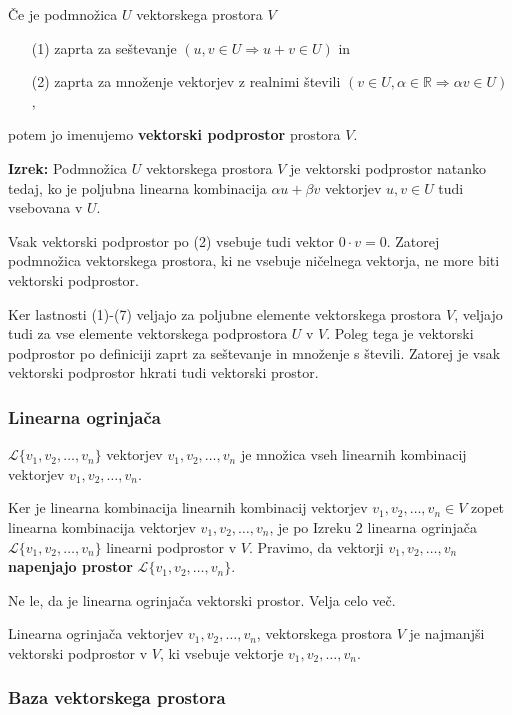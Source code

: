 \documentclass{article}
\begin{document}
\begin{multicols}{2}
Če je podmnožica \( U \) vektorskega prostora \( V \)
\begin{itemize}
    \item[(1)] zaprta za seštevanje \( (u, v \in U \Rightarrow u + v \in U) \) in
    \item[(2)] zaprta za množenje vektorjev z realnimi števili \( (v \in U, \alpha \in \mathbb{R} \Rightarrow \alpha v \in U) \),
\end{itemize}
potem jo imenujemo \textbf{vektorski podprostor} prostora \( V \).

\textbf{Izrek:} Podmnožica \( U \) vektorskega prostora \( V \) je vektorski podprostor natanko tedaj, ko je poljubna linearna kombinacija \( \alpha u + \beta v \) vektorjev \( u, v \in U \) tudi vsebovana v \( U \).

Vsak vektorski podprostor po (2) vsebuje tudi vektor \( 0 \cdot v = 0 \). Zatorej podmnožica vektorskega prostora, ki ne vsebuje ničelnega vektorja, ne more biti vektorski podprostor.

Ker lastnosti (1)-(7) veljajo za poljubne elemente vektorskega prostora \( V \), veljajo tudi za vse elemente vektorskega podprostora \( U \) v \( V \). Poleg tega je vektorski podprostor po definiciji zaprt za seštevanje in množenje s števili. Zatorej je vsak vektorski podprostor hkrati tudi vektorski prostor.

\subsubsection{Linearna ogrinjača} \( \mathcal{L}\{v_1, v_2, \ldots, v_n\} \) vektorjev \( v_1, v_2, \ldots, v_n \) je množica vseh linearnih kombinacij vektorjev \( v_1, v_2, \ldots, v_n \).

Ker je linearna kombinacija linearnih kombinacij vektorjev \( v_1, v_2, \ldots, v_n \in V \) zopet linearna kombinacija vektorjev \( v_1, v_2, \ldots, v_n \), je po Izreku 2 linearna ogrinjača \( \mathcal{L}\{v_1, v_2, \ldots, v_n\} \) linearni podprostor v \( V \). Pravimo, da vektorji \( v_1, v_2, \ldots, v_n \) \textbf{napenjajo prostor} \( \mathcal{L}\{v_1, v_2, \ldots, v_n\} \).

Ne le, da je linearna ogrinjača vektorski prostor. Velja celo več.

 Linearna ogrinjača vektorjev \( v_1, v_2, \ldots, v_n \), vektorskega prostora \( V \) je najmanjši vektorski podprostor v \( V \), ki vsebuje vektorje \( v_1, v_2, \ldots, v_n \).

\subsubsection{Baza vektorskega prostora}


\end{multicols}
\end{document}
